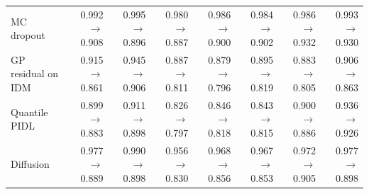 \begin{table}[htbp]
\begin{tabular}{lrrrrrrr}
MC dropout & 0.992 $\rightarrow$ 0.908 & 0.995 $\rightarrow$ 0.896 & 0.980 $\rightarrow$ 0.887 & 0.986 $\rightarrow$ 0.900 & 0.984 $\rightarrow$ 0.902 & 0.986 $\rightarrow$ 0.932 & 0.993 $\rightarrow$ 0.930 \\
GP residual on IDM & 0.915 $\rightarrow$ 0.861 & 0.945 $\rightarrow$ 0.906 & 0.887 $\rightarrow$ 0.811 & 0.879 $\rightarrow$ 0.796 & 0.895 $\rightarrow$ 0.819 & 0.883 $\rightarrow$ 0.805 & 0.906 $\rightarrow$ 0.863 \\
Quantile PIDL & 0.899 $\rightarrow$ 0.883 & 0.911 $\rightarrow$ 0.898 & 0.826 $\rightarrow$ 0.797 & 0.846 $\rightarrow$ 0.818 & 0.843 $\rightarrow$ 0.815 & 0.900 $\rightarrow$ 0.886 & 0.936 $\rightarrow$ 0.926 \\
Diffusion & 0.977 $\rightarrow$ 0.889 & 0.990 $\rightarrow$ 0.898 & 0.956 $\rightarrow$ 0.830 & 0.968 $\rightarrow$ 0.856 & 0.967 $\rightarrow$ 0.853 & 0.972 $\rightarrow$ 0.905 & 0.977 $\rightarrow$ 0.898 \\
\bottomrule
\end{tabular}
\end{table}
